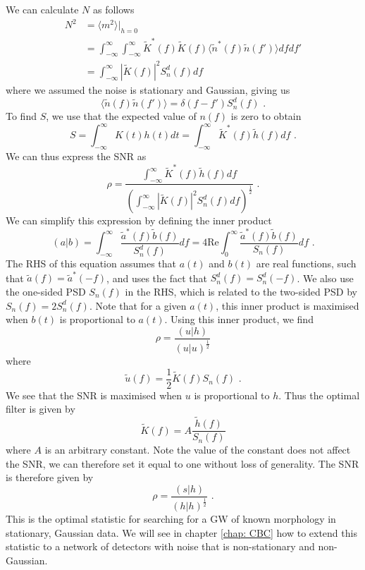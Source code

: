 \documentclass[11pt]{cuthesis}
\newcommand{\fs}{\text{ .}}
\begin{document}
We can calculate $N$ as follows
\begin{equation}
\begin{split}
N^2 & = \langle m^2 \rangle |_{h=0} \\ 
& = \int^\infty_{-\infty} \int^\infty_{-\infty} \tilde{K}^*(f) \tilde{K}(f) \langle \tilde{n}^* (f) \tilde{n}(f') \rangle df df' \\
& = \int^\infty_{-\infty}  |\tilde{K}(f) |^2 S^d_n(f)df
\end{split} 
\end{equation}
where we assumed the noise is stationary and Gaussian, giving us
\begin{equation}
\langle \tilde{n}(f) \tilde{n}(f') \rangle = \delta (f-f') S^d_n (f) \fs
\end{equation}
To find $S$, we use that the expected value of $n(f)$ is zero to obtain
\begin{equation}
S = \int^\infty_{-\infty} K(t) h(t) dt  = \int^\infty_{-\infty} \tilde{K}^*(f) \tilde{h}(f) df \fs
\end{equation} 
We can thus express the SNR as 
\begin{equation}
\rho = \frac{\int^\infty_{-\infty} \tilde{K}^*(f) \tilde{h}(f) df}{ \left( \int^\infty_{-\infty}  |\tilde{K}(f) |^2 S^d_n(f)df \right)^{\frac{1}{2} } } \fs
\end{equation}
We can simplify this expression by defining the inner product
\begin{equation}
(a|b) = \int^\infty_{-\infty} \frac{\tilde{a}^*(f) \tilde{b}(f)}{S^d_n(f)} df = 4 \text{Re} \int^\infty_0 \frac{\tilde{a}^*(f) \tilde{b}(f)}{S_n(f)} df \fs 
\end{equation}
The RHS of this equation assumes that $a(t)$ and $b(t)$ are real functions, such that $\tilde{a}(f)=\tilde{a}^*(-f)$, and uses the fact that $S^d_n(f) = S^d_n(-f)$. We also use the one-sided PSD $S_n(f)$ in the RHS, which is related to the two-sided PSD by $S_n(f)=2S^d_n(f)$. Note that for a given $a(t)$, this inner product is maximised when $b(t)$ is proportional to $a(t)$. Using this inner product, we find
\begin{equation}
\rho = \frac{(u|h)}{(u|u)^\frac{1}{2}}
\end{equation}
where
\begin{equation}
\tilde{u}(f) = \frac{1}{2} \tilde{K}(f) S_n(f) \fs
\end{equation}
We see that the SNR is maximised when $u$ is proportional to $h$. Thus the optimal filter is given by
\begin{equation}
\tilde{K}(f) = A \frac{\tilde{h}(f)}{S_n(f)}
\end{equation}
where $A$ is an arbitrary constant. Note the value of the constant does not affect the SNR, we can therefore set it equal to one without loss of generality. The SNR is therefore given by
\begin{equation}
\rho = \frac{(s|h)}{(h|h)^\frac{1}{2}} \fs
\end{equation} 
This is the optimal statistic for searching for a GW of known morphology in stationary, Gaussian data. We will see in chapter \ref{chap: CBC} how to extend this statistic to a network of detectors with noise that is non-stationary and non-Gaussian.
\end{document}
